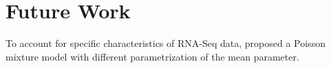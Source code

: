 \section{Future Work} \label{future-work-sect}
To account for specific characteristics of RNA-Seq data, \citet{Rau2013} proposed a Poisson mixture model with different parametrization of the mean parameter. 